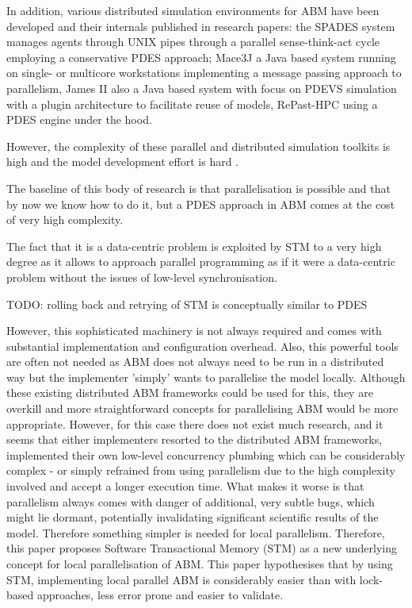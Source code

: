 In addition, various distributed simulation environments for ABM have been developed and their internals published in research papers: the SPADES system \cite{riley_next_2003} manages agents through UNIX pipes through a parallel sense-think-act cycle employing a conservative PDES approach; Mace3J \cite{gasser_mace3j:_2002} a Java based system running on single- or multicore workstations implementing a message passing approach to parallelism, James II \cite{himmelspach_plugn_2007} also a Java based system with focus on PDEVS simulation with a plugin architecture to facilitate reuse of models, RePast-HPC \cite{minson_distributing_2008, gorur_repast_2016} using a PDES engine under the hood. 

However, the complexity of these parallel and distributed simulation toolkits is high and the model development effort is hard \cite{abar_agent_2017}.

The baseline of this body of research is that parallelisation is possible and that by now we know how to do it, but a PDES approach in ABM comes at the cost of very high complexity.

The fact that it is a data-centric problem is exploited by STM to a very high degree as it allows to approach parallel programming as if it were a data-centric problem without the issues of low-level synchronisation.

TODO: rolling back and retrying of STM is conceptually similar to PDES

However, this sophisticated machinery is not always required and comes with substantial implementation and configuration overhead. Also, this powerful tools are often not needed as ABM does not always need to be run in a distributed way but the implementer 'simply' wants to parallelise the model locally. Although these existing distributed ABM frameworks could be used for this, they are overkill and more straightforward concepts for parallelising ABM would be more appropriate. However, for this case there does not exist much research, and it seems that either implementers resorted to the distributed ABM frameworks, implemented their own low-level concurrency plumbing which can be considerably complex - or simply refrained from using parallelism due to the high complexity involved and accept a longer execution time. What makes it worse is that parallelism always comes with danger of additional, very subtle bugs, which might lie dormant, potentially invalidating significant scientific results of the model. Therefore something simpler is needed for local parallelism.
Therefore, this paper proposes Software Transactional Memory (STM) as a new underlying concept for local parallelisation of ABM. This paper hypothesises that by using STM, implementing local parallel ABM is considerably easier than with lock-based approaches, less error prone and easier to validate. 

